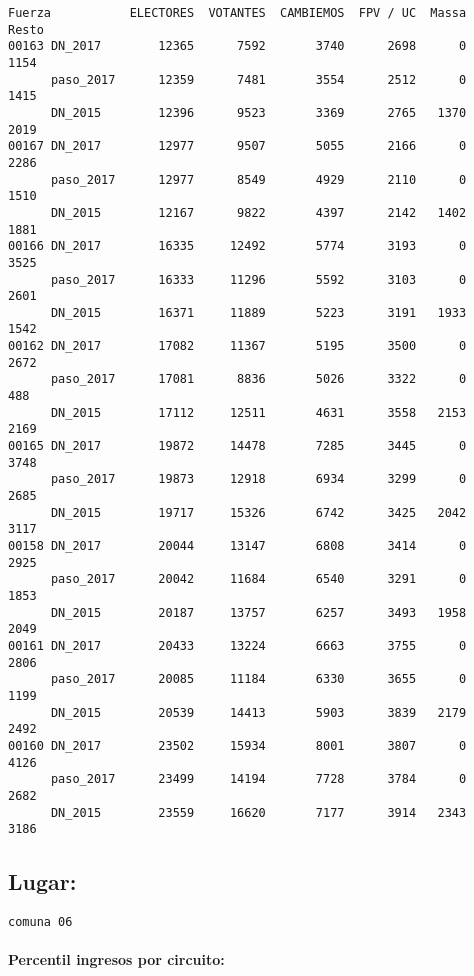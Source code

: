\documentclass[11pt]{article}
\begin{document}
    \begin{verbatim}
Fuerza           ELECTORES  VOTANTES  CAMBIEMOS  FPV / UC  Massa  Resto
00163 DN_2017        12365      7592       3740      2698      0   1154
      paso_2017      12359      7481       3554      2512      0   1415
      DN_2015        12396      9523       3369      2765   1370   2019
00167 DN_2017        12977      9507       5055      2166      0   2286
      paso_2017      12977      8549       4929      2110      0   1510
      DN_2015        12167      9822       4397      2142   1402   1881
00166 DN_2017        16335     12492       5774      3193      0   3525
      paso_2017      16333     11296       5592      3103      0   2601
      DN_2015        16371     11889       5223      3191   1933   1542
00162 DN_2017        17082     11367       5195      3500      0   2672
      paso_2017      17081      8836       5026      3322      0    488
      DN_2015        17112     12511       4631      3558   2153   2169
00165 DN_2017        19872     14478       7285      3445      0   3748
      paso_2017      19873     12918       6934      3299      0   2685
      DN_2015        19717     15326       6742      3425   2042   3117
00158 DN_2017        20044     13147       6808      3414      0   2925
      paso_2017      20042     11684       6540      3291      0   1853
      DN_2015        20187     13757       6257      3493   1958   2049
00161 DN_2017        20433     13224       6663      3755      0   2806
      paso_2017      20085     11184       6330      3655      0   1199
      DN_2015        20539     14413       5903      3839   2179   2492
00160 DN_2017        23502     15934       8001      3807      0   4126
      paso_2017      23499     14194       7728      3784      0   2682
      DN_2015        23559     16620       7177      3914   2343   3186
    \end{verbatim}

    
    \hypertarget{lugar}{%
\subsection{Lugar:}\label{lugar}}

    
    \begin{Verbatim}[commandchars=\\\{\}]
comuna 06

    \end{Verbatim}

    \hypertarget{percentil-ingresos-por-circuito}{%
\paragraph{Percentil ingresos por
circuito:}\label{percentil-ingresos-por-circuito}}
\end{document}
